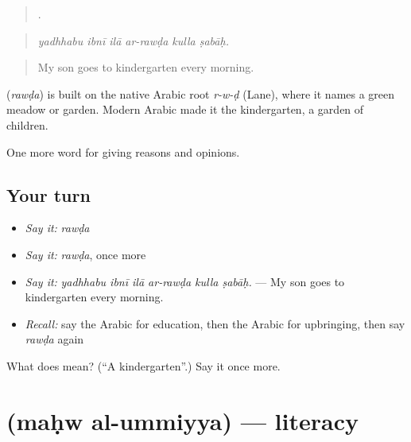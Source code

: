 \begin{quote}
     .
\end{quote}

\begin{quote}
\emph{yadhhabu ibnī ilā ar-rawḍa kulla ṣabāḥ.}
\end{quote}

\begin{quote}
My son goes to kindergarten every morning.
\end{quote}

\begin{cousinweb}
\textbf{} (\emph{rawḍa}) is built on the native Arabic root \emph{r-w-ḍ} (Lane), where it names a green meadow or garden. Modern Arabic made it the kindergarten, a garden of children.
\end{cousinweb}

\begin{grammarlens}[title={What you've built}]
One more word for giving reasons and opinions.
\end{grammarlens}

\subsection*{Your turn}
\begin{itemize}
\raggedright
  \item \emph{Say it:} \emph{rawḍa}
  \item \emph{Say it:} \emph{rawḍa}, once more
  \item \emph{Say it:} \emph{yadhhabu ibnī ilā ar-rawḍa kulla ṣabāḥ.} — My son goes to kindergarten every morning.
  \item \emph{Recall:} say the Arabic for education, then the Arabic for upbringing, then say \emph{rawḍa} again
\end{itemize}

\begin{tcolorbox}[breakable,colback=teal!4,colframe=teal!35!black,title={Before you move on}]
What does  mean? (\textquotedblleft{}A kindergarten\textquotedblright{}.) Say it once more.
\end{tcolorbox}
\section[\texorpdfstring{\ar{محو} \ar{الأمية} (maḥw al-ummiyya)}{محو الأمية (maḥw al-ummiyya)}]{  (maḥw al-ummiyya) — literacy}

